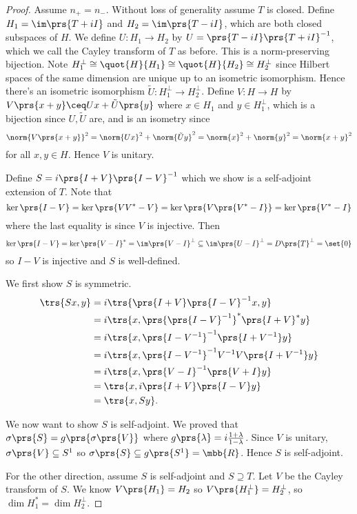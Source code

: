 \documentclass[10pt, twoside]{book}
\begin{document}
\begin{proof}
Assume $n_+ = n_-$. Without loss of generality assume $T$ is closed. Define $H_1 = \im\prs{T+iI}$ and $H_2 = \im\prs{T-iI}$, which are both closed subspaces of $H$.
We define $U \colon H_1 \to H_2$ by $U = \prs{T - iI}\prs{T+iI}^{-1}$, which we call the Cayley transform of $T$ as before. This is a norm-preserving bijection. Note $H_1^\perp \cong \quot{H}{H_1} \cong \quot{H}{H_2} \cong H_2^\perp$ since Hilbert spaces of the same dimension are unique up to an isometric isomorphism.
Hence there's an isometric isomorphism $\tilde{U} \colon H_1^\perp \to H_2^\perp$. Define $V \colon H \to H$ by $V\prs{x+y} \ceq Ux + \tilde{U}\prs{y}$ where $x \in H_1$ and $y \in H_1^\perp$, which is a bijection since $U, \tilde{U}$ are, and is an isometry since \[\norm{V\prs{x+y}}^2 = \norm{Ux}^2 + \norm{\tilde{U}y}^2 = \norm{x}^2 + \norm{y}^2 = \norm{x+y}^2\] for all $x,y \in H$.
Hence $V$ is unitary.

Define $S = i\prs{I+V}\prs{I-V}^{-1}$ which we show is a self-adjoint extension of $T$.
Note that \[\ker\prs{I-V} = \ker\prs{VV^* - V} = \ker\prs{V\prs{V^* - I}} = \ker\prs{V^* - I}\] where the last equality is since $V$ is injective. Then \[\ker\prs{I-V} = \ker\prs{V-I}^* = \im\prs{V-I}^\perp \subseteq \im\prs{U-I}^\perp = D\prs{T}^\perp = \set{0}\]
so $I-V$ is injective and $S$ is well-defined.

We first show $S$ is symmetric.
\begin{align*}
\trs{Sx, y} &= i\trs{\prs{I+V}\prs{I-V}^{-1} x, y}
\\&= i\trs{x, \prs{\prs{I-V}^{-1}}^*\prs{I+V}^*y}
\\&= i\trs{x, \prs{I-V^{-1}}^{-1}\prs{I+V^{-1}}y}
\\&= i\trs{x, \prs{I-V^{-1}}^{-1}V^{-1}V\prs{I+V^{-1}}y}
\\&= i\trs{x, \prs{V-I}^{-1}\prs{V+I}y}
\\&= \trs{x, i\prs{I+V}\prs{I-V}y}
\\&= \trs{x, Sy} \text{.}
\end{align*}

We now want to show $S$ is self-adjoint. We proved that $\sigma\prs{S} = g\prs{\sigma\prs{V}}$ where $g\prs{\lambda} = i\frac{1+\lambda}{1-\lambda}$. Since $V$ is unitary, $\sigma\prs{V} \subseteq S^1$ so $\sigma\prs{S} \subseteq g\prs{S^1} = \mbb{R}$. Hence $S$ is self-adjoint.

For the other direction, assume $S$ is self-adjoint and $S \supseteq T$. Let $V$ be the Cayley transform of $S$. We know $V\prs{H_1} = H_2$ so $V\prs{H_1^\perp} = H_2^\perp$, so $\dim H_1^* = \dim H_2^\perp$.
\end{proof}
\end{document}
